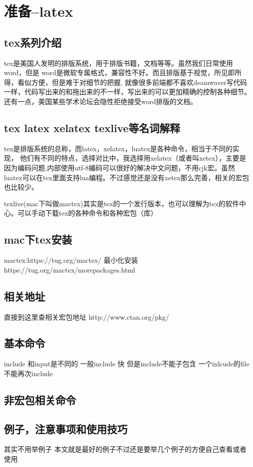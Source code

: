 \section{准备--latex}
\subsection{tex系列介绍}
 tex是美国人发明的排版系统，用于排版书籍，文档等等。虽然我们日常使用word，但是
 word是微软专属格式，兼容性不好。而且排版基于视觉，所见即所得，看似方便，但是难于对细节的把握,
 就像很多前端都不喜欢deamwaver写代码一样，代码写出来的和拖出来的不一样，写出来的可以更加精确的控制各种细节。
 还有一点，美国某些学术论坛会隐性拒绝接受word排版的文档。
\subsection{tex latex xelatex texlive等名词解释}
 tex是排版系统的总称，而latex，xelatex，luatex是各种命令，相当于不同的实现，
 他们有不同的特点，选择对比中，我选择用xelatex（或者叫xetex），主要是因为编码问题,内部使用utf-8编码可以很好的解决中文问题，不用cjk宏。虽然luatex可以在tex里面支持lua编程。不过感觉还是没有xetex那么完善，相关的宏包也比较少。\par
 texlive(mac下叫做mactex)其实是tex的一个发行版本，也可以理解为tex的软件中心。可以手动下载tex的各种命令和各种宏包（库）
\subsection{mac下tex安装}
mactex:https://tug.org/mactex/
最小化安装https://tug.org/mactex/morepackages.html
\subsection{相关地址}
直接到这里查相关宏包地址 http://www.ctan.org/pkg/
\subsection{基本命令}
include 和input是不同的 一般include 快 但是include不能子包含
一个inlcude的file不能再次include
\subsection{非宏包相关命令}
\subsection{例子，注意事项和使用技巧}
其实不用举例子 本文就是最好的例子不过还是要举几个例子的方便自己查看或者使用
